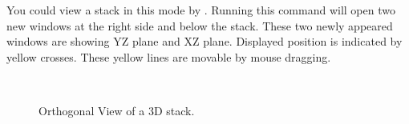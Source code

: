 You could view a stack in this mode by . Running this command will open two new windows at the right side and below the stack. These two newly appeared windows are showing YZ plane and XZ plane. Displayed position is indicated by yellow crosses. These yellow lines are movable by mouse dragging. 

\begin{figure}[h!]
 \centering
\\
 \caption{Orthogonal View of a 3D stack.}
 \label{fig:orthogonalView}
\end{figure}

